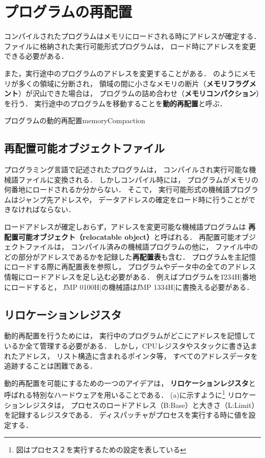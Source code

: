 \section{プログラムの再配置}
コンパイルされたプログラムはメモリにロードされる時にアドレスが確定する．
ファイルに格納された実行可能形式プログラムは，
ロード時にアドレスを変更できる必要がある．

また，実行途中のプログラムのアドレスを変更することがある．
のようにメモリが多くの領域に分断され，
領域の間に小さなメモリの断片（{\bf メモリフラグメント}）が沢山できた場合は，
プログラムの詰め合わせ（{\bf メモリコンパクション}）を行う．
実行途中のプログラムを移動することを{\bf 動的再配置}と呼ぶ．

{プログラムの動的再配置}{memoryCompaction}

\subsection{再配置可能オブジェクトファイル}
プログラミング言語で記述されたプログラムは，
コンパイルされ実行可能な機械語ファイルに変換される．
しかしコンパイル時には，
プログラムがメモリの何番地にロードされるか分からない．
そこで，
実行可能形式の機械語プログラムはジャンプ先アドレスや，
データアドレスの確定をロード時に行うことができなければならない．

ロードアドレスが確定しおらず，アドレスを変更可能な機械語プログラムは
{\bf 再配置可能オブジェクト（relocatable object）}と呼ばれる．
再配置可能オブジェクトファイルは，
コンパイル済みの機械語プログラムの他に，
ファイル中のどの部分がアドレスであるかを記録した{\bf 再配置表}も含む．
プログラムを主記憶にロードする際に再配置表を参照し，
プログラムやデータ中の全てのアドレス情報にロードアドレスを足し込む必要がある．
例えばプログラムを\|1234H|番地にロードすると，
\|JMP 0100H|の機械語は\|JMP 1334H|に書換える必要がある．

\subsection{リロケーションレジスタ}
動的再配置を行うためには，
実行中のプログラムがどこにアドレスを記憶しているか全て管理する必要がある．
しかし，CPUレジスタやスタックに書き込まれたアドレス，
リスト構造に含まれるポインタ等，
すべてのアドレスデータを追跡することは困難である．

動的再配置を可能にするための一つのアイデアは，
{\bf リロケーションレジスタ}と呼ばれる特別なハードウェアを用いることである．
(a)に示すように\footnote{
図はプロセス２を実行するための設定を表している}
リロケーションレジスタは，
プロセスのロードアドレス（B:Base）と大きさ（L:Limit）を記録するレジスタである．
ディスパッチャがプロセスを実行する時に値を設定する．

